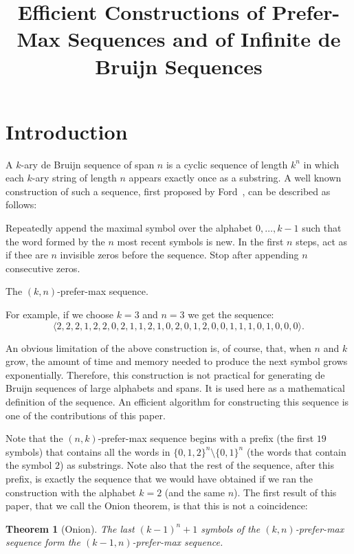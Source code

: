 \documentclass{article}
\title{Efficient Constructions of Prefer-Max Sequences and of Infinite de Bruijn Sequences}
\author{}
\newtheorem{theorem}{Theorem}
\theoremstyle{definition}
\begin{document}
\maketitle

\section{Introduction}

A $k$-ary de Bruijn sequence of span $n$ is a cyclic sequence of length $k^n$ in which each $k$-ary string of length $n$ appears exactly once as
a substring. A well known construction of such a sequence, first proposed by Ford~\cite{Ford1957}, can be described as follows:

\begin{algorithm}
Repeatedly append the maximal symbol over the alphabet $0,\dots,k-1$ such that the word formed by the $n$ most recent symbols is new. In the first $n$ steps, act as if thee are $n$ invisible zeros before the sequence. Stop after appending $n$ consecutive zeros. 
\caption{The $(k,n)$-prefer-max sequence.}
\label{pref-max}
\end{algorithm}


For example, if we choose $k=3$ and $n=3$ we get the sequence:
$$\langle2,2,2,1,2,2,0,2,1,1,2,1,0,2,0,1,2,0,0,1,1,1,0,1,0,0,0\rangle.$$


An obvious limitation of the above construction is, of course, that, when $n$ and $k$ grow, the amount of time and memory needed to produce the next symbol grows exponentially. Therefore, this construction is not practical for generating de Bruijn sequences of large alphabets and spans. It is used here as a mathematical definition of the sequence. An efficient algorithm for constructing this sequence is one of the contributions of this paper.

Note that the $(n,k)$-prefer-max sequence begins with a prefix (the first $19$ symbols) that contains all the words in $\{0,1,2\}^n \setminus \{0,1\}^n$  (the words that contain the symbol $2$) as substrings. Note also that the rest of the sequence, after this prefix, is exactly the sequence that we would have obtained if we ran the construction with the alphabet $k=2$ (and the same $n$). The first result of this paper, that we call the Onion theorem, is that this is not a coincidence:

\begin{theorem}[Onion]
	The last $(k-1)^n+1$ symbols of the $(k,n)$-prefer-max sequence form the $(k-1,n)$-prefer-max sequence.
\label{thm:onion}
\end{theorem} 
\end{document}
